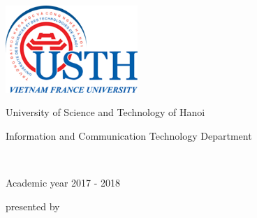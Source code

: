 \newpage
\empty
\thispagestyle{empty}

\begin{center}






\includegraphics[angle=0,width=5cm]{images/logo-1_39.png}


\vspace*{1cm} 



{\huge University of Science and Technology of Hanoi }\\


\vspace*{1cm} 


{\large Information and Communication Technology Department}\\


\vspace*{1cm} 



{\huge \MasterLevel }\\


\vspace*{1cm} 

{\large Academic year 2017 -  2018}


\vfill


\noindent\hrulefill

\vspace*{2mm} 

{\Large \InternshipTitle }


\noindent\hrulefill





\vfill 



{\large presented by } \\

\vspace*{5mm} 


{\large \bf \FirstName~  \LastName} \\


\vspace*{5mm} 



\end{center}
